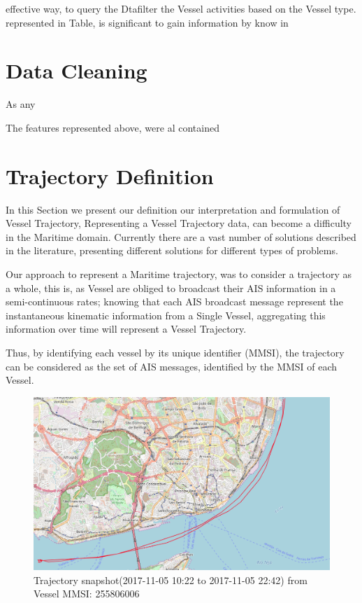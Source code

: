 effective way, to query the Dtafilter the Vessel activities based on the Vessel type.
represented in Table, is significant to gain information by know in

\section{Data Cleaning}
As any 

 The features represented above, were al contained 

\section{Trajectory Definition}
In this Section we present our definition our interpretation and formulation of Vessel Trajectory, 
Representing a Vessel Trajectory data, can become a difficulty in the Maritime domain. Currently there are a vast number of solutions described in the literature, presenting different solutions for different types of problems. 

Our approach to represent a Maritime trajectory, was to consider a trajectory as a whole, this is, as Vessel are obliged to broadcast their AIS information in a semi-continuous rates; knowing that each AIS broadcast message represent the instantaneous kinematic information from a Single Vessel, aggregating this information over time will represent a Vessel Trajectory. 

Thus, by identifying each vessel by its unique identifier (MMSI), the trajectory can be considered as the set of AIS messages, identified by the MMSI of each Vessel.

\begin{figure}[H]
	\centering
	\includegraphics[scale = .3]{figures/Ch3/traj_example.png}
    \caption{Trajectory snapshot(2017-11-05 10:22 to 2017-11-05 22:42) from Vessel MMSI: 255806006}
    \label{fig: TrajectorySMM_example}
\end{figure}

